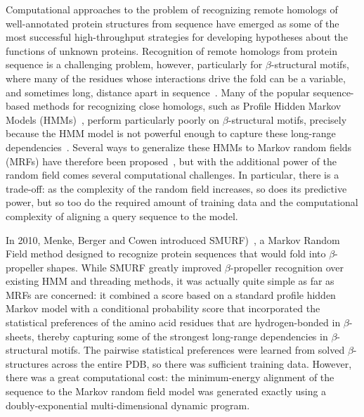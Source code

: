 \documentclass{acm_proc_article-sp}
\begin{document}
Computational approaches to the problem of recognizing remote homologs of
well-annotated protein structures from sequence have emerged as some of the most
successful high-throughput strategies for developing hypotheses about the
functions of unknown proteins.
Recognition of remote homologs from protein sequence is a challenging problem,
however, particularly for $\beta$-structural motifs, where many of the
residues whose interactions drive the fold can be a variable, and sometimes
long, distance apart in sequence~\cite{Menke:2010ti}. 
Many of the popular
sequence-based methods for recognizing close homologs, such as Profile
Hidden Markov Models (HMMs)~\cite{Eddy:1998ut,Hughey:1996ub}, perform 
particularly poorly on
$\beta$-structural motifs, precisely because the HMM model is not
powerful enough to capture these long-range 
dependencies~\cite{Lifson:1980vd, Zhu:1999wr, Olmea:1999ug, 
Cowen:2002p588,Steward:2002wz}. 
Several ways
to generalize these HMMs to Markov random fields (MRFs) have therefore
been 
proposed~\cite{White:1994ty, Lathrop:1996gm, Thomas:2008uw, 
Gopalakrishnan:2009wx, Menke:2010ti, Peng:2011vk}, but with the additional 
power of the 
random field comes several computational challenges. 
In particular, there is a trade-off: as the complexity of the random field
increases, so does its predictive power, but so too do the required amount of 
training data and the computational complexity of aligning a query sequence
to the model.

In 2010, Menke, Berger and Cowen introduced
SMURF)~\cite{Menke:2010ti}, a Markov Random Field method designed to
recognize protein sequences that would fold into $\beta$-propeller
shapes. 
While SMURF greatly improved $\beta$-propeller recognition over
existing HMM and threading methods, it was actually quite simple as
far as MRFs are concerned: it combined a score based on a standard profile 
hidden Markov model with a conditional probability score that incorporated
the statistical preferences of the amino acid residues that are
hydrogen-bonded in $\beta$-sheets, thereby capturing some of the
strongest long-range dependencies in $\beta$-structural motifs.
The
pairwise statistical preferences were learned from solved
$\beta$-structures across the entire PDB, so there was sufficient
training data. 
However, there was a great computational cost: the
minimum-energy alignment of the sequence to the Markov random field model
was generated exactly using a doubly-exponential multi-dimensional
dynamic program.
\end{document}
